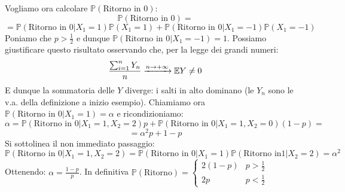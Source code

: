 Vogliamo ora calcolare $\mathbb{P}(\text{Ritorno in }0)$:
\[\mathbb{P}(\text{Ritorno in }0)=\]
\[=\mathbb{P}(\text{Ritorno in }0|X_1=1)\mathbb{P}(X_1=1)+\mathbb{P}(\text{Ritorno in }0|X_1=-1)\mathbb{P}(X_1=-1)\]
Poniamo che $p>\frac{1}{2}$ e dunque $\mathbb{P}(\text{Ritorno in }0|X_1=-1)=1$. Possiamo giustificare questo risultato osservando che, per la legge dei grandi numeri:
\[\frac{\sum_{i=1}^nY_n}{n}\xrightarrow{n\to +\infty}\mathbb{E} Y\neq0\]
E dunque la sommatoria delle $Y$ diverge: i salti in alto dominano (le $Y_n$ sono le v.a. della definizione a inizio esempio). Chiamiamo ora $\mathbb{P}(\text{Ritorno in }0|X_1=1)=\alpha$ e ricondizioniamo:
\[\alpha=\mathbb{P}(\text{Ritorno in }0|X_1=1,X_2=2)p+\mathbb{P}(\text{Ritorno in }0|X_1=1,X_2=0)(1-p)=\]\[=\alpha^2p+1-p\]
Si sottolinea il non immediato passaggio:
\[\mathbb{P}(\text{Ritorno in }0|X_1=1,X_2=2)=\mathbb{P}(\text{Ritorno in }0|X_1=1)\mathbb{P}(\text{Ritorno in}1|X_2=2)=\alpha^2\]
Ottenendo: $\alpha=\frac{1-p}{p}$. 
\newline
In definitiva $\mathbb{P}(\text{Ritorno})= \begin{cases}
2(1-p) & p>\frac{1}{2}
\\2p & p<\frac{1}{2}
\end{cases}$
\vspace{25px}


